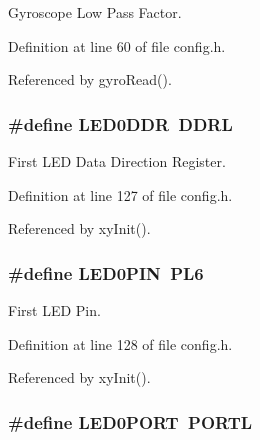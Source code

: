 Gyroscope Low Pass Factor. 



Definition at line 60 of file config.\-h.



Referenced by gyro\-Read().

\hypertarget{group__config_ga86208659221ec2a932cd722dfc18101f}{
\subsubsection[{L\-E\-D0\-D\-D\-R}]{\setlength{\rightskip}{0pt plus 5cm}\#define L\-E\-D0\-D\-D\-R~D\-D\-R\-L}}\label{group__config_ga86208659221ec2a932cd722dfc18101f}


First L\-E\-D Data Direction Register. 



Definition at line 127 of file config.\-h.



Referenced by xy\-Init().

\hypertarget{group__config_gab0e1f692e2b1fa1cdbb24a9926b3489d}{
\subsubsection[{L\-E\-D0\-P\-I\-N}]{\setlength{\rightskip}{0pt plus 5cm}\#define L\-E\-D0\-P\-I\-N~P\-L6}}\label{group__config_gab0e1f692e2b1fa1cdbb24a9926b3489d}


First L\-E\-D Pin. 



Definition at line 128 of file config.\-h.



Referenced by xy\-Init().

\hypertarget{group__config_gac0f99671c3447a31e5d3755e1f11ee1f}{
\subsubsection[{L\-E\-D0\-P\-O\-R\-T}]{\setlength{\rightskip}{0pt plus 5cm}\#define L\-E\-D0\-P\-O\-R\-T~P\-O\-R\-T\-L}}\label{group__config_gac0f99671c3447a31e5d3755e1f11ee1f}


